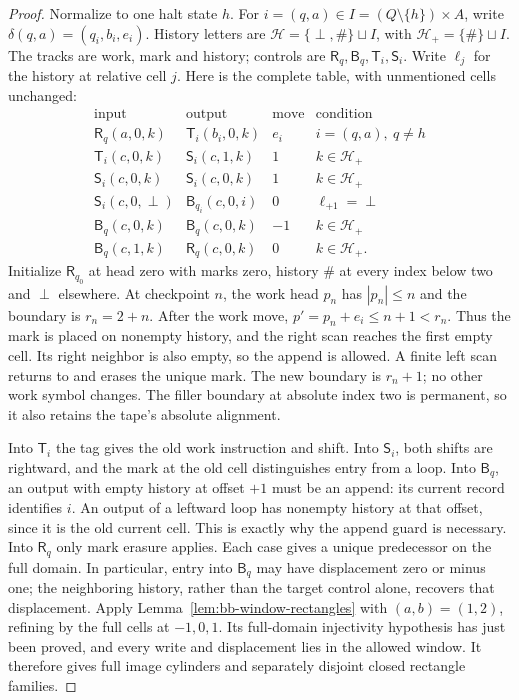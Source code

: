 \begin{proof}\label{bc:halfline-table-proof}
Normalize to one halt state $h$. For $i=(q,a)\in I=(Q\setminus\{h\})\times A$,
write $\delta(q,a)=(q_i,b_i,e_i)$. History letters are
$\mathcal H=\{\perp,\#\}\sqcup I$, with
$\mathcal H_+=\{\#\}\sqcup I$. The tracks are work, mark and history;
controls are $\mathsf R_q,\mathsf B_q,\mathsf T_i,\mathsf S_i$.
Write $\ell_j$ for the history at relative cell $j$.
Here is the complete table, with unmentioned cells unchanged:
\begin{equation}\label{bc:halfline-rules}
\begin{array}{c|c|c|l}
\text{input}&\text{output}&\text{move}&\text{condition}\\\hline
\mathsf R_q(a,0,k)&\mathsf T_i(b_i,0,k)&e_i&i=(q,a),\ q\ne h\\
\mathsf T_i(c,0,k)&\mathsf S_i(c,1,k)&1&k\in\mathcal H_+\\
\mathsf S_i(c,0,k)&\mathsf S_i(c,0,k)&1&k\in\mathcal H_+\\
\mathsf S_i(c,0,\perp)&\mathsf B_{q_i}(c,0,i)&0&\ell_{+1}=\perp\\
\mathsf B_q(c,0,k)&\mathsf B_q(c,0,k)&-1&k\in\mathcal H_+\\
\mathsf B_q(c,1,k)&\mathsf R_q(c,0,k)&0&k\in\mathcal H_+.
\end{array}
\end{equation}
Initialize $\mathsf R_{q_0}$ at head zero with marks zero, history $\#$
at every index below two and $\perp$ elsewhere. At checkpoint $n$, the
work head $p_n$ has $|p_n|\le n$ and the boundary is $r_n=2+n$.
After the work move, $p'=p_n+e_i\le n+1<r_n$. Thus the mark is placed
on nonempty history, and the right scan reaches the first empty cell.
Its right neighbor is also empty, so the append is allowed. A finite
left scan returns to and erases the unique mark. The new boundary is
$r_n+1$; no other work symbol changes. The filler boundary at absolute
index two is permanent, so it also retains the tape's absolute alignment.

Into $\mathsf T_i$ the tag gives the old work instruction and shift.
Into $\mathsf S_i$, both shifts are rightward, and the mark at the old
cell distinguishes entry from a loop. Into $\mathsf B_q$, an output
with empty history at offset $+1$ must be an append: its current record
identifies $i$. An output of a leftward loop has nonempty history at
that offset, since it is the old current cell. This is exactly why the
append guard is necessary. Into $\mathsf R_q$ only mark erasure applies.
Each case gives a unique predecessor on the full domain.  In particular,
entry into $\mathsf B_q$ may have displacement zero or minus one;
the neighboring history, rather than the target control alone, recovers
that displacement.  Apply Lemma~\ref{lem:bb-window-rectangles} with
$(a,b)=(1,2)$, refining by the full cells at $-1,0,1$.
Its full-domain injectivity hypothesis has just been proved, and every
write and displacement lies in the allowed window.  It therefore gives
full image cylinders and separately disjoint closed rectangle families.
\end{proof}

